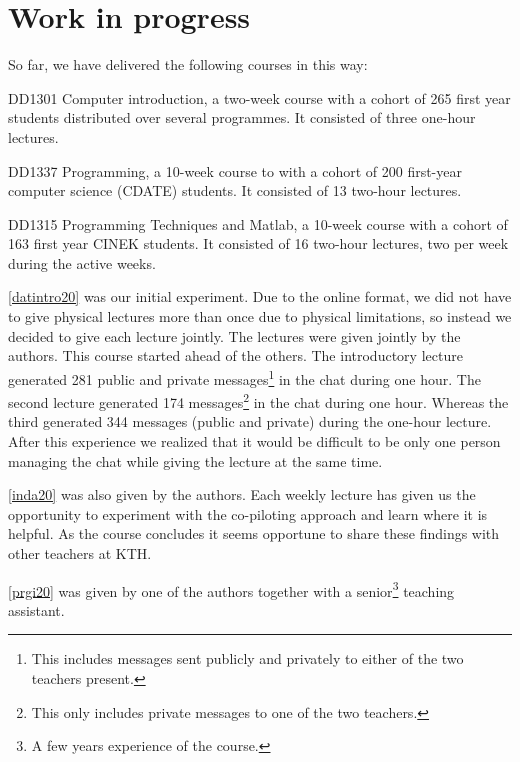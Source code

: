 \documentclass{article}
\begin{document}
\section*{Work in progress}

So far, we have delivered the following courses in this way:
\begin{courses}
  \item\label{datintro20} DD1301 Computer introduction, a two-week course with 
    a cohort of 265 first year students distributed over several programmes.
    It consisted of three one-hour lectures.

  \item\label{inda20} DD1337 Programming, a 10-week course to with a cohort of 
    200 first-year computer science (CDATE) students.
    It consisted of 13 two-hour lectures.

  \item\label{prgi20} DD1315 Programming Techniques and Matlab, a 10-week 
    course with a cohort of 163 first year CINEK students.
    It consisted of 16 two-hour lectures, two per week during the active weeks.
\end{courses}

\ref{datintro20} was our initial experiment.
Due to the online format, we did not have to give physical lectures more than 
once due to physical limitations, so instead we decided to give each lecture 
jointly.
The lectures were given jointly by the authors.
This course started ahead of the others.
The introductory lecture generated
281
public and private messages\footnote{%
  This includes messages sent publicly and privately to either of the two 
  teachers present.
} in the chat during one hour.
The second lecture generated
174
messages\footnote{%
  This only includes private messages to one of the two teachers.
} in the chat during one hour.
Whereas the third generated
344
messages (public and private) during the one-hour lecture.
After this experience we realized that it would be difficult to be only one 
person managing the chat while giving the lecture at the same time.

\ref{inda20} was also given by the authors.
Each weekly lecture has given us the opportunity to experiment with the 
co-piloting approach and learn where it is helpful.
As the course concludes it seems opportune to share these findings with other 
teachers at KTH.

\ref{prgi20} was given by one of the authors together with a senior\footnote{%
  A few years experience of the course.
} teaching assistant.
\end{document}
